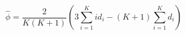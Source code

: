 

\[
\hat{\phi} = \frac{2}{K(K+1)} \left(3\sum_{i=1}^{K}{id_{i}} - (K+1)\sum_{i=1}^{K}{d_{i}} \right)
\]


